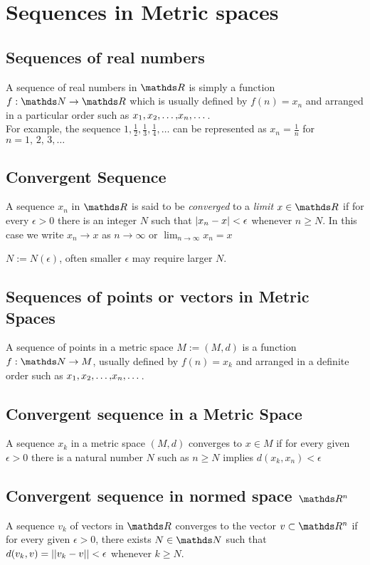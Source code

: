 \documentclass[../main-sheet.tex]{subfiles}
\begin{document}
\chapter{Sequences in Metric spaces}
\section{Sequences of real numbers}
A sequence of real numbers in $ \R $ is simply a function $ f:\N\to\R $ which is usually defined by $ f(n)=x_n $ and arranged in a particular order such as $ {x}_1{,}\,{x}_2{,}\dots{,}{x}_n,\dots $.\\

For example, the sequence $ 1,\frac{1}{2},\frac{1}{3},\frac{1}{4},\dots $ can be represented as $ x_n=\frac{1}{n} $ for $ n=1,\,2,\,3,\dots $
\section{Convergent Sequence}
A sequence $ x_n $ in $ \R $ is said to be \emph{converged} to a \emph{limit} $ x\in \R $ if for every $ \epsilon>0 $ there is an integer $ N $ such that $ \left\vert x_n-x\right\vert<\epsilon $ whenever $ n\geq N $. In this case we write $ x_n \to x $ as $ n\to \infty $ or $ \lim_{n \to \infty} x_n=x$
\begin{note}
    $ N:=N(\epsilon) $, often smaller $ \epsilon $ may require larger $ N $.
\end{note}
\section{Sequences of points or vectors in Metric Spaces}
A sequence of points in a metric space $ M:=(M,d) $ is a function $ f:\N\to M $, usually defined by $ f(n)=x_k $ and arranged in a definite order such as $ {x}_1{,}\,{x}_2{,}\dots{,}{x}_n,\dots $.
\section{Convergent sequence in a Metric Space}
A sequence $ x_k $ in a metric space $ (M, d) $ converges to $ x\in M $ if for every given $ \epsilon>0 $ there is a natural number $ N $ such as $ n\geq N $ implies $ d(x_k,x_n)<\epsilon $
\section{Convergent sequence in normed space $ \R^n $} 
A sequence $ v_k $ of vectors in $ \R $ converges to the vector $ v\subset \R^n $ if for every given $ \epsilon>0 $, there exists $ N\in\N $ such that $ d(v_k,v)=\left\vert\left\vert v_k-v\right\vert\right\vert<\epsilon $ whenever $ k\geq N $.
\end{document}
